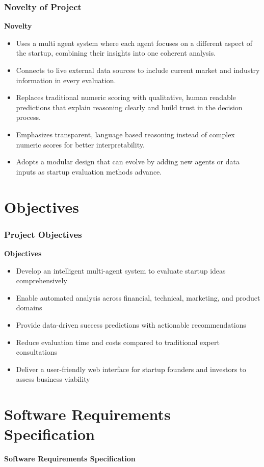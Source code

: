 \documentclass{beamer}
\begin{document}
\begin{frame}
\frametitle{Novelty of Project}
    \textbf{Novelty}
    \begin{itemize}

\item Uses a multi agent system where each agent focuses on a different aspect of the startup, combining their insights into one coherent analysis.
\item Connects to live external data sources to include current market and industry information in every evaluation.
\item Replaces traditional numeric scoring with qualitative, human readable predictions that explain reasoning clearly and build trust in the decision process.
\item Emphasizes transparent, language based reasoning instead of complex numeric scores for better interpretability.
\item Adopts a modular design that can evolve by adding new agents or data inputs as startup evaluation methods advance.
    \end{itemize}
\end{frame}
\section{Objectives}

\begin{frame}
\frametitle{Project Objectives}
    \textbf{Objectives}
    \begin{itemize}
        \item Develop an intelligent multi-agent system to evaluate startup ideas comprehensively
        \item Enable automated analysis across financial, technical, marketing, and product domains
        \item Provide data-driven success predictions with actionable recommendations
        \item Reduce evaluation time and costs compared to traditional expert consultations
        \item Deliver a user-friendly web interface for startup founders and investors to assess business viability
    \end{itemize}
\end{frame}

\section{Software Requirements Specification}
\begin{frame}
\begin{center}
    \huge \textbf{Software Requirements Specification}
\end{center}
\end{frame}
\end{document}
